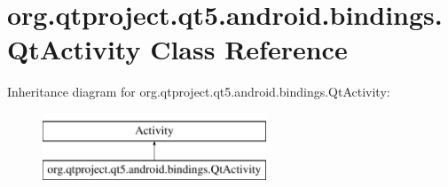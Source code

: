 \hypertarget{classorg_1_1qtproject_1_1qt5_1_1android_1_1bindings_1_1_qt_activity}{\section{org.\+qtproject.\+qt5.\+android.\+bindings.\+Qt\+Activity Class Reference}
\label{classorg_1_1qtproject_1_1qt5_1_1android_1_1bindings_1_1_qt_activity}
}
Inheritance diagram for org.\+qtproject.\+qt5.\+android.\+bindings.\+Qt\+Activity\+:\begin{figure}[H]
\begin{center}
\leavevmode
\includegraphics[height=2.000000cm]{classorg_1_1qtproject_1_1qt5_1_1android_1_1bindings_1_1_qt_activity}
\end{center}
\end{figure}

